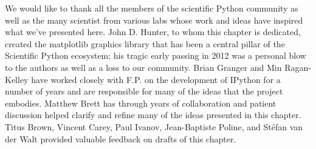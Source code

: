 \documentclass[ChapterTOCs,krantz2]{krantz} %
\begin{document}
We would like to thank all the members of the scientific Python community as
well as the many scientist from various labs whose work and ideas have inspired
what we've presented here.  John D. Hunter, to whom this chapter is dedicated,
created the matplotlib graphics library that has been a central pillar of the
Scientific Python ecosystem; his tragic early passing in 2012 was a personal
blow to the authors as well as a loss to our community.  Brian Granger and Min
Ragan-Kelley have worked closely with F.P. on the development of IPython for a
number of years and are responsible for many of the ideas that the project
embodies.  Matthew Brett has through years of collaboration and patient
discussion helped clarify and refine many of the ideas presented in this
chapter.  Titus Brown, Vincent Carey, Paul Ivanov, Jean-Baptiste Poline, and
Stéfan van der Walt provided valuable feedback on drafts of this chapter.




\end{document}
